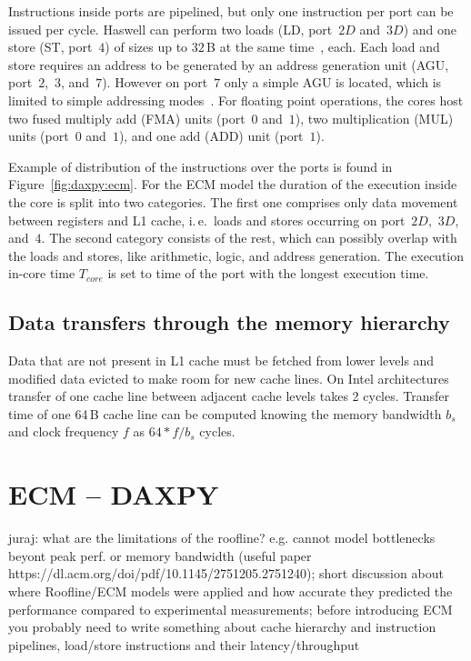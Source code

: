 Instructions inside ports are pipelined, but only one instruction per port can
be issued per cycle.
Haswell can perform two loads (LD, port~$2D$ and~$3D$) and one store (ST,
port~$4$) of sizes up to $32$\,B at the same time~\cite{intel-orm-2016}, each.
Each load and store requires an address to be generated by an address
generation unit (AGU, port~$2$,~$3$, and~$7$).
However on port~$7$ only a simple AGU is located, which is limited to simple
addressing modes~\cite{intel-orm-2016,hofmann-2016-hsw}.
%
For floating point operations, the cores host two fused multiply add
(FMA) units (port~$0$ and~$1$), two multiplication (MUL) units (port~$0$
and~$1$), and one add (ADD) unit (port~$1$).

Example of distribution of the instructions over the ports is found in
Figure~\ref{fig:daxpy:ecm}.
For the ECM model the duration of the execution inside the core is split into
two categories.
The first one comprises only data movement between registers and L1 cache,
i.\,e.\ loads and stores occurring on port~$2D$,~$3D$, and~$4$.
The second category consists of the rest, which can possibly overlap with the
loads and stores, like arithmetic, logic, and address generation.
The execution in-core time $T_{core}$ is set to time of the port with the longest execution time.

\subsection*{Data transfers through the memory hierarchy}

Data that are not present in L1 cache must be fetched from lower levels and modified data evicted to make room for new cache lines.
On Intel architectures transfer of one cache line between adjacent cache levels takes 2 cycles.
Transfer time of one 64\,B cache line can be computed knowing the memory bandwidth $b_s$ and clock frequency $f$ as $64*f/b_s$ cycles.

\todop{}

\section{ECM -- DAXPY}
\label{sec:epm}

{\color{blue} juraj: what are the limitations of the roofline? e.g. cannot model bottlenecks beyont peak perf. or memory bandwidth (useful paper https://dl.acm.org/doi/pdf/10.1145/2751205.2751240); short discussion about where Roofline/ECM models were applied and how accurate they predicted the performance compared to experimental measurements; before introducing ECM you probably need to write something about cache hierarchy and instruction pipelines, load/store instructions and their latency/throughput}

